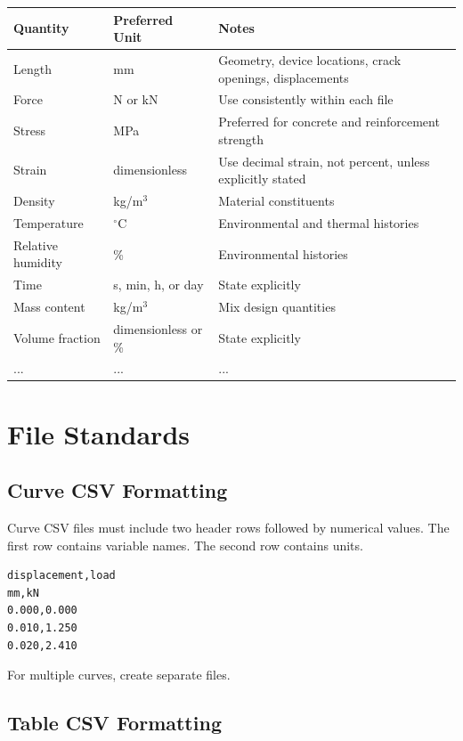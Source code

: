 \documentclass[11pt]{book}
\begin{document}
\begin{longtable}{p{}p{}p{}}
\toprule
\textbf{Quantity} & \textbf{Preferred Unit} & \textbf{Notes} \\
\midrule
Length & mm & Geometry, device locations, crack openings, displacements \\
Force & N or kN & Use consistently within each file \\
Stress & MPa & Preferred for concrete and reinforcement strength \\
Strain & dimensionless & Use decimal strain, not percent, unless explicitly stated \\
Density & kg/m$^3$ & Material constituents \\
Temperature & $^\circ$C & Environmental and thermal histories \\
Relative humidity & \% & Environmental histories \\
Time & s, min, h, or day & State explicitly \\
Mass content & kg/m$^3$ & Mix design quantities \\
Volume fraction & dimensionless or \% & State explicitly \\
... & ... & ... \\
\bottomrule
\end{longtable}

\section{File Standards}

\subsection{Curve CSV Formatting}

Curve CSV files must include two header rows followed by numerical values. The first row contains variable names. The second row contains units.

\begin{verbatim}
displacement,load
mm,kN
0.000,0.000
0.010,1.250
0.020,2.410
\end{verbatim}

For multiple curves, create separate files.

\subsection{Table CSV Formatting}
\end{document}
